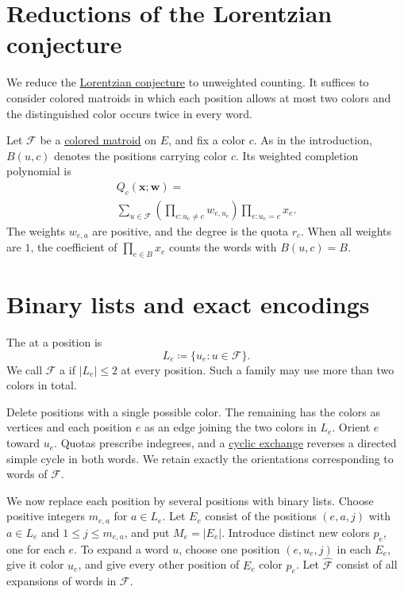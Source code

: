 
\section[completionReductions]{Reductions of the Lorentzian conjecture}

We reduce the \href{rank.htm#lorentzianConjecture}{Lorentzian conjecture}
to unweighted counting. It suffices to consider colored matroids in
which each position allows at most two colors and the distinguished
color occurs twice in every word.

Let $\mathcal F$ be a \href{intro.htm#coloredMatroids}{colored matroid}
on $E$, and fix a color $c$. As in the introduction, $B(u,c)$ denotes
the positions carrying color $c$. Its weighted completion polynomial is
\[
 \begin{gathered}
 Q_c(\mathbf x;\mathbf w)=\\
 \sum_{u\in\mathcal F}
 \left(\prod_{e:u_e\ne c}w_{e,u_e}\right)
 \prod_{e:u_e=c}x_e.
 \end{gathered}
\]
The weights $w_{e,a}$ are positive, and the degree is the quota $r_c$.
When all weights are $1$, the coefficient of $\prod_{e\in B}x_e$
counts the words with $B(u,c)=B$.

\section[binaryLists]{Binary lists and exact encodings}

The  at a position is
\[
 L_e\coloneqq\{u_e:u\in\mathcal F\}.
\]
We call $\mathcal F$ a  if $|L_e|\leq2$ at
every position. Such a family may use more than two colors in total.

Delete positions with a single possible color. The remaining
 has the colors as vertices and each position $e$
as an edge joining the two colors in $L_e$. Orient $e$ toward $u_e$.
Quotas prescribe indegrees, and a \href{intro.htm#cyclicExchange}{cyclic
exchange} reverses a directed simple cycle in both words. We retain
exactly the orientations corresponding to words of $\mathcal F$.

We now replace each position by several positions with binary lists.
Choose positive integers $m_{e,a}$ for $a\in L_e$. Let $E_e$ consist
of the positions $(e,a,j)$ with $a\in L_e$ and $1\leq j\leq m_{e,a}$,
and put $M_e=|E_e|$.
Introduce distinct new colors $p_e$, one for each $e$. To expand a word
$u$, choose one position $(e,u_e,j)$ in each $E_e$, give it color $u_e$,
and give every other position of $E_e$ color $p_e$.
Let $\widehat{\mathcal F}$ consist of all expansions of words in
$\mathcal F$.

